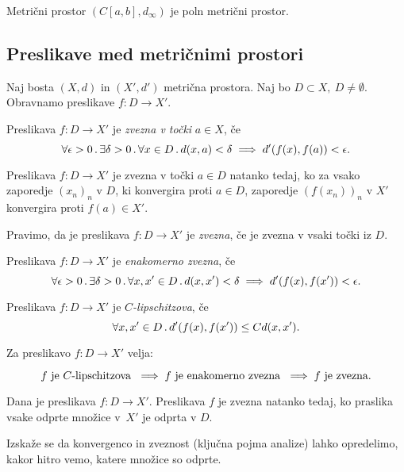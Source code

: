 \begin{izrek}
    Metrični prostor $(C[a,b], d_\infty)$ je poln metrični prostor.
\end{izrek}

\subsection*{Preslikave med metričnimi prostori}
Naj bosta $(X, d)$ in $(X', d')$ metrična prostora. Naj bo $D \subset X, \ D \neq \emptyset$. Obravnamo preslikave $f: D \to X'$.

\begin{definicija}
    Preslikava $f: D \to X'$ je \emph{zvezna v točki} $a \in X$, če
    $$\forall \epsilon > 0 \,.\, \exists \delta > 0 \,.\, \forall x \in D \,.\, d(x, a) < \delta \implies d'(f(x), f(a)) < \epsilon.$$
\end{definicija}

\begin{izrek}
    Preslikava $f: D \to X'$ je zvezna v točki $a \in D$ natanko tedaj, ko za vsako zaporedje $(x_n)_n$ v $D$, ki konvergira proti $a \in D$, zaporedje $(f(x_n))_n$ v $X'$ konvergira proti $f(a) \in X'$. 
\end{izrek}

\begin{definicija}
    Pravimo, da je preslikava $f: D \to X'$ je \emph{zvezna}, če je zvezna v vsaki točki iz $D$.
\end{definicija}

\begin{definicija}
    Preslikava $f: D \to X'$ je \emph{enakomerno zvezna}, če
    $$\forall \epsilon > 0 \,.\, \exists \delta > 0 \,.\, \forall x, x' \in D \,.\, d(x, x') < \delta \implies d'(f(x), f(x')) < \epsilon.$$
\end{definicija}

\begin{definicija}
    Preslikava $f: D \to X'$ je \emph{$C$-lipschitzova}, če
    $$\forall x, x' \in D \,.\, d'(f(x), f(x')) \leq Cd(x, x').$$
\end{definicija}

\begin{trditev}
    Za preslikavo $f: D \to X'$ velja:

    $$f \text{ je $C$-lipschitzova } \implies f \text{ je enakomerno zvezna } \implies f \text{ je zvezna}.$$
\end{trditev}

\begin{izrek}
    Dana je preslikava $f: D \to X'$. Preslikava $f$ je zvezna natanko tedaj, ko praslika vsake odprte množice v~$X'$ je odprta v $D$.
\end{izrek}

Izskaže se da konvergenco in zveznost (ključna pojma analize) lahko opredelimo, kakor hitro vemo, katere množice so odprte.